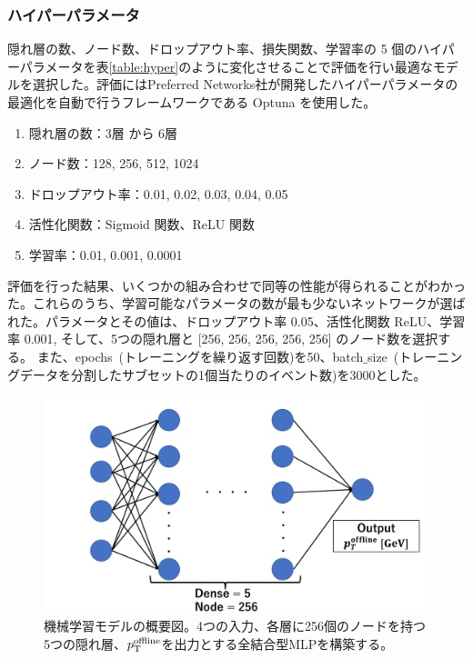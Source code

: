 \subsubsection{ハイパーパラメータ}
隠れ層の数、ノード数、ドロップアウト率、損失関数、学習率の 5 個のハイパーパラメータを表\ref{table:hyper}のように変化させることで評価を行い最適なモデルを選択した。評価にはPreferred Networks社が開発したハイパーパラメータの最適化を自動で行うフレームワークである Optuna \cite{article:optuna}を使用した。
\begin{enumerate}\label{table:hyper}
   \item 隠れ層の数：3層 から 6層
   \item ノード数：128, 256, 512, 1024
   \item ドロップアウト率：0.01, 0.02, 0.03, 0.04, 0.05
   \item 活性化関数：Sigmoid 関数、ReLU 関数
   \item 学習率：0.01, 0.001, 0.0001
\end{enumerate}
評価を行った結果、いくつかの組み合わせで同等の性能が得られることがわかった。これらのうち、学習可能なパラメータの数が最も少ないネットワークが選ばれた。パラメータとその値は、ドロップアウト率 0.05、活性化関数 ReLU、学習率 0.001, そして、5つの隠れ層と [256, 256, 256, 256, 256] のノード数を選択する。
また、epochs~(トレーニングを繰り返す回数)を50、batch$\_$size~(トレーニングデータを分割したサブセットの1個当たりのイベント数)を3000とした。

\begin{figure}[tb]
  \centering
  \includegraphics[clip, width=12cm]{fig/4/MLP_2.pdf}
  \caption{機械学習モデルの概要図。4つの入力、各層に256個のノードを持つ5つの隠れ層、$p_{\rm{T}}^{\rm{offline}}$を出力とする全結合型MLPを構築する。}
  \label{fig:MLP_overview}
\end{figure}


